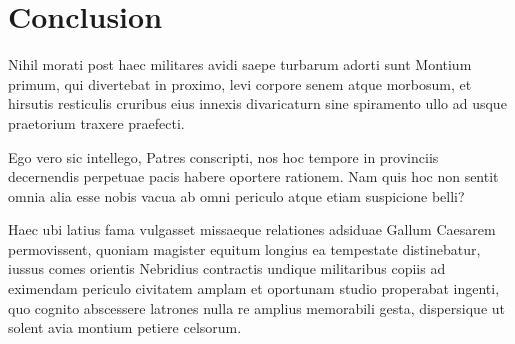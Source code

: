 \chapter{Conclusion}
Nihil morati post haec militares avidi saepe turbarum adorti sunt Montium primum, qui divertebat in proximo, levi corpore senem atque morbosum, et hirsutis resticulis cruribus eius innexis divaricaturn sine spiramento ullo ad usque praetorium traxere praefecti.

Ego vero sic intellego, Patres conscripti, nos hoc tempore in provinciis decernendis perpetuae pacis habere oportere rationem. Nam quis hoc non sentit omnia alia esse nobis vacua ab omni periculo atque etiam suspicione belli?

Haec ubi latius fama vulgasset missaeque relationes adsiduae Gallum Caesarem permovissent, quoniam magister equitum longius ea tempestate distinebatur, iussus comes orientis Nebridius contractis undique militaribus copiis ad eximendam periculo civitatem amplam et oportunam studio properabat ingenti, quo cognito abscessere latrones nulla re amplius memorabili gesta, dispersique ut solent avia montium petiere celsorum.
